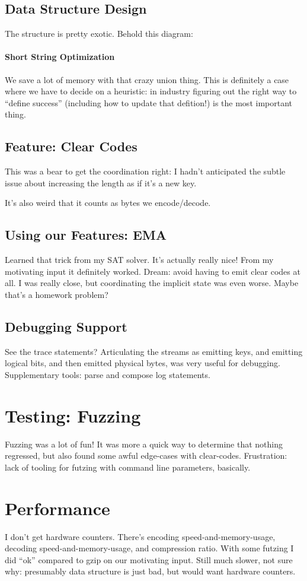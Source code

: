 \documentclass{scrartcl}
\begin{document}
\subsection{Data Structure Design}
The structure is pretty exotic.
Behold this diagram:

\paragraph{Short String Optimization}
We save a lot of memory with that crazy union thing.
This is definitely a case where we have to decide on a heuristic: in industry figuring out the right way to ``define success'' (including how to update that defition!) is the most important thing.
\subsection{Feature: Clear Codes}
This was a bear to get the coordination right: I hadn't anticipated the subtle issue about increasing the length as if it's a new key.

It's also weird that it counts as bytes we encode/decode.
\subsection{Using our Features: EMA}
Learned that trick from my SAT solver.
It's actually really nice! From my motivating input it definitely worked.
Dream: avoid having to emit clear codes at all.
I was really close, but coordinating the implicit state was even worse.
Maybe that's a homework problem?
\subsection{Debugging Support}
See the trace statements?
Articulating the streams as emitting keys, and emitting logical bits, and then emitted physical bytes, was very useful for debugging.
Supplementary tools: parse and compose log statements.
\section{Testing: Fuzzing}
Fuzzing was a lot of fun!
It was more a quick way to determine that nothing regressed, but also found some awful edge-cases with clear-codes.
Frustration: lack of tooling for futzing with command line parameters, basically.
\section{Performance}
I don't get hardware counters.
There's encoding speed-and-memory-usage, decoding speed-and-memory-usage, and compression ratio.
With some futzing I did ``ok'' compared to gzip on our motivating input.
Still much slower, not sure why: presumably data structure is just bad, but would want hardware counters.
\end{document}
